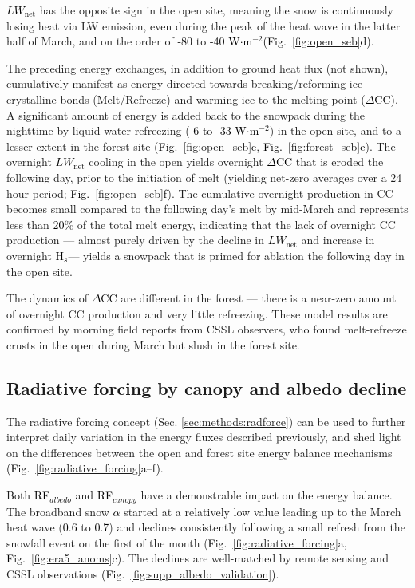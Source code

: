 \documentclass[draft]{agujournal2019}
\newcommand{\fig}[2]{\textcolor{black}{(Fig.~\ref{#1}{#2})}}   %
\newcommand{\fignop}[2]{\textcolor{black}{Fig.~\ref{#1}{#2}}}  %
\newcommand{\mynum}[1]{\textcolor{black}{#1}}
\newcommand{\lwnet}{\textcolor{black}{$LW_{\mathrm{net}}$}\xspace}
\newcommand{\hs}{\textcolor{black}{H$_s$}\xspace}
\newcommand{\dcc}{\textcolor{black}{$\Delta$CC}\xspace}
\newcommand{\albedo}{\textcolor{black}{$\alpha$}\xspace}
\newcommand{\rfalb}{\textcolor{black}{RF$_{albedo}$}\xspace}
\newcommand{\rfcanopy}{\textcolor{black}{RF$_{canopy}$}\xspace}
\newcommand{\wmsq}{\textcolor{black}{W$\cdot$m$^{-2}$}\xspace}
\begin{document}
\lwnet has the opposite sign in the open site, meaning the snow is continuously losing heat via LW emission, even during the peak of the heat wave in the latter half of March, and on the order of \mynum{-80} to \mynum{-40} \wmsq \fig{fig:open_seb}{d}.

The preceding energy exchanges, in addition to ground heat flux (not shown), cumulatively manifest as energy directed towards breaking/reforming ice crystalline bonds (Melt/Refreeze) and warming ice to the melting point (\dcc).
A significant amount of energy is added back to the snowpack during the nighttime by liquid water refreezing (\mynum{-6 to -33} \wmsq) in the open site, and to a lesser extent in the forest site (\fignop{fig:open_seb}{e}, \fignop{fig:forest_seb}{e}).
The overnight \lwnet cooling in the open yields overnight \dcc that is eroded the following day, prior to the initiation of melt (yielding net-zero averages over a 24 hour period; \fignop{fig:open_seb}{f}).
The cumulative overnight production in CC becomes small compared to the following day's melt by mid-March and represents less than \mynum{20}\% of the total melt energy, indicating that the lack of overnight CC production --- almost purely driven by the decline in \lwnet and increase in overnight \hs --- yields a snowpack that is primed for ablation the following day in the open site.

The dynamics of \dcc are different in the forest --- there is a near-zero amount of overnight CC production and very little refreezing.
These model results are confirmed by morning field reports from CSSL observers, who found melt-refreeze crusts in the open during March but slush in the forest site.


\subsection{Radiative forcing by canopy and albedo decline}
The radiative forcing concept (Sec. \ref{sec:methods:radforce}) can be used to further interpret daily variation in the energy fluxes described previously, and shed light on the differences between the open and forest site energy balance mechanisms \fig{fig:radiative_forcing}{a--f}.

Both \rfalb and \rfcanopy have a demonstrable impact on the energy balance.
The broadband snow \albedo started at a relatively low value leading up to the March heat wave (\mynum{0.6} to \mynum{0.7}) and declines consistently following a small refresh from the snowfall event on the first of the month (\fignop{fig:radiative_forcing}{a}, \fignop{fig:era5_anoms}{c}).
The declines are well-matched by remote sensing and CSSL observations \fig{fig:supp_albedo_validation}{}.
\end{document}
